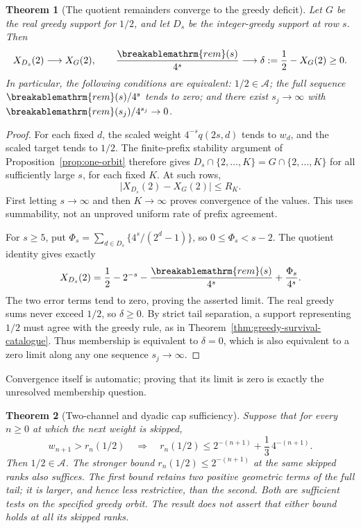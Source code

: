 \documentclass[11pt]{article}
\theoremstyle{plain}
\newtheorem{thm}{Theorem}[section]
\theoremstyle{definition}
\theoremstyle{remark}
\renewcommand{\mathrm}[1]{\ifmmode\breakablemathrm{#1}\else\textrm{#1}\fi}%
\begin{document}
\begin{thm}[The quotient remainders converge to the greedy deficit]
\label{thm:seam-limit}
Let $G$ be the real greedy support for $1/2$, and let $D_s$ be the
integer-greedy support at row $s$.  Then
\[
 X_{D_s}(2)\longrightarrow X_G(2),\qquad
 \frac{\mathrm{rem}(s)}{4^s}\longrightarrow
 \delta:=\frac12-X_G(2)\ge0.
\]
In particular, the following conditions are equivalent: $1/2\in\mathcal A$;
the full sequence $\mathrm{rem}(s)/4^s$ tends to zero; and there
exist $s_j\to\infty$ with $\mathrm{rem}(s_j)/4^{s_j}\to0$.
\end{thm}
\begin{proof}
For each fixed $d$, the scaled weight
$4^{-s}q(2s,d)$ tends to $w_d$, and the scaled target tends to
$1/2$.  The finite-prefix stability argument of
Proposition~\ref{prop:one-orbit} therefore gives
$D_s\cap\{2,\ldots,K\}=G\cap\{2,\ldots,K\}$ for all sufficiently
large $s$, for each fixed $K$.  At such rows,
\[
 \bigl|X_{D_s}(2)-X_G(2)\bigr|\le R_K.
\]
First letting $s\to\infty$ and then $K\to\infty$ proves convergence
of the values.  This uses summability, not an unproved uniform
rate of prefix agreement.

For $s\ge5$, put
$\Phi_s=\sum_{d\in D_s}\{4^s/(2^d-1)\}$, so
$0\le\Phi_s<s-2$.  The quotient identity gives exactly
\[
 X_{D_s}(2)=\frac12-2^{-s}
            -\frac{\mathrm{rem}(s)}{4^s}+\frac{\Phi_s}{4^s}.
\]
The two error terms tend to zero, proving the asserted limit.
The real greedy sums never exceed $1/2$, so $\delta\ge0$.
By strict tail separation, a support representing $1/2$ must agree
with the greedy rule, as in Theorem~\ref{thm:greedy-survival-catalogue}.
Thus membership is equivalent to $\delta=0$, which is also equivalent
to a zero limit along any one sequence $s_j\to\infty$.
\end{proof}
Convergence itself is automatic; proving that its limit is zero is
exactly the unresolved membership question.

\begin{thm}[Two-channel and dyadic cap sufficiency]
\label{thm:two-channel-cap}
Suppose that for every $n\ge0$ at which the next weight is skipped,
\[
 w_{n+1}>r_n(1/2)\quad\Longrightarrow\quad
 r_n(1/2)\le 2^{-(n+1)}+\frac13\,4^{-(n+1)}.
\]
Then $1/2\in\mathcal A$.  The stronger bound
$r_n(1/2)\le2^{-(n+1)}$ at the same skipped ranks also suffices.
The first bound retains two positive geometric terms of the full tail;
it is larger, and hence less restrictive, than the second.  Both are
sufficient tests on the specified greedy orbit.  The result does not
assert that either bound holds at all its skipped ranks.
\end{thm}
\end{document}
